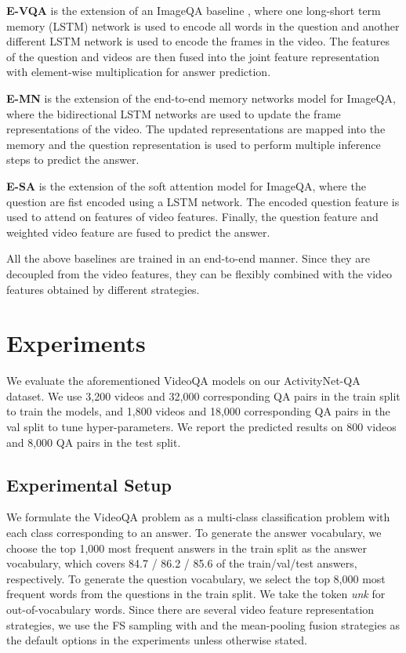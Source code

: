\documentclass[letterpaper]{article} \usepackage{aaai19}  \usepackage{times}  \usepackage{helvet}  \usepackage{courier}  \usepackage{url}  \usepackage{graphicx}  \usepackage{amsfonts}
\begin{document}
\textbf{E-VQA} is the extension of an ImageQA baseline \cite{antol2015vqa}, where one long-short term memory (LSTM) network \cite{hochreiter1997long} is used to encode all words in the question and another different LSTM network is used to encode the frames in the video. The features of the question and videos are then fused into the joint feature representation with element-wise multiplication for answer prediction.

\textbf{E-MN} is the extension of the end-to-end memory networks model \cite{sukhbaatar2015end} for ImageQA, where the bidirectional LSTM networks are used to update the frame representations of the video. The updated representations are mapped into the memory and the question representation is used to perform multiple inference steps to predict the answer.

\textbf{E-SA} is the extension of the soft attention model \cite{yao2015describing} for ImageQA, where the question are fist encoded using a LSTM network. The encoded question feature is used to attend on features of video features. Finally, the question feature and weighted video feature are fused to predict the answer.

All the above baselines are trained in an end-to-end manner. Since they are decoupled from the video features, they can be flexibly combined with the video features obtained by different strategies.

\section{Experiments}
We evaluate the aforementioned VideoQA models on our ActivityNet-QA dataset. We use 3,200 videos and 32,000 corresponding QA pairs in the {train} split to train the models, and 1,800 videos and 18,000 corresponding QA pairs in the {val} split to tune hyper-parameters. We report the predicted results on 800 videos and 8,000 QA pairs in the {test} split.

\subsection{Experimental Setup}
We formulate the VideoQA problem as a multi-class classification problem with each class corresponding to an answer. To generate the answer vocabulary, we choose the top 1,000 most frequent answers in the train split as the answer vocabulary, which covers 84.7 / 86.2 / 85.6 of the train/val/test answers, respectively. To generate the question vocabulary, we select the top 8,000 most frequent words from the questions in the {train} split. We take the token \emph{unk} for out-of-vocabulary words. Since there are several video feature representation strategies, we use the FS sampling with  and the mean-pooling fusion strategies as the default options in the experiments unless otherwise stated.
\end{document}
